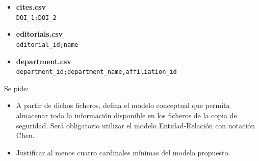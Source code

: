 \documentclass[
    12pt,
    a4paper,
    addpoints,
    answers,
    convocatoria=ext,
    titulacion=NoCD,
    curso=2023/2024,
]{db-exam}
\begin{document}
\begin{questions}
\begin{itemize}
    \item \textbf{cites.csv} \vspace{0.5em} \\
    \texttt{DOI\_1;DOI\_2\\
    }
    
    \item \textbf{editorials.csv} \vspace{0.5em} \\
    \texttt{editorial\_id;name\\
    }
    
    \item \textbf{department.csv} \vspace{0.5em} \\
    \texttt{department\_id;department\_name,affiliation\_id\\
    }

\end{itemize}

Se pide: 

\begin{itemize}
    \item A partir de dichos ficheros, defina el modelo conceptual que permita almacenar toda la información disponible en los ficheros de la copia de seguridad. Será obligatorio utilizar el modelo Entidad-Relación con notación Chen.
    \item Justificar al menos cuatro cardinales mínimas del modelo propuesto.
\end{itemize}



\end{questions}
\end{document}
